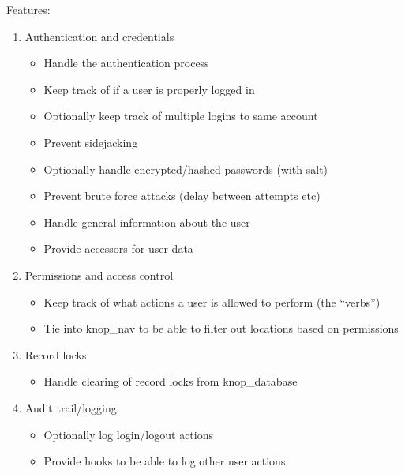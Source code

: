 \documentclass[letterpaper,10pt,english]{sphinxmanual}
\begin{document}
\begin{fulllineitems}
Features:
\begin{enumerate}
\item {} 
Authentication and credentials
\begin{itemize}
\item {} 
Handle the authentication process

\item {} 
Keep track of if a user is properly logged in

\item {} 
Optionally keep track of multiple logins to same account

\item {} 
Prevent sidejacking

\item {} 
Optionally handle encrypted/hashed passwords (with salt)

\item {} 
Prevent brute force attacks (delay between attempts etc)

\item {} 
Handle general information about the user

\item {} 
Provide accessors for user data

\end{itemize}

\item {} 
Permissions and access control
\begin{itemize}
\item {} 
Keep track of what actions a user is allowed to perform (the ``verbs'')

\item {} 
Tie into knop\_nav to be able to filter out locations based on permissions

\end{itemize}

\item {} 
Record locks
\begin{itemize}
\item {} 
Handle clearing of record locks from knop\_database

\end{itemize}

\item {} 
Audit trail/logging
\begin{itemize}
\item {} 
Optionally log login/logout actions

\item {} 
Provide hooks to be able to log other user actions


\end{itemize}
\end{enumerate}
\end{fulllineitems}
\end{document}
